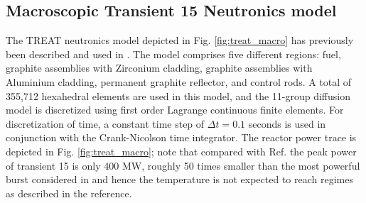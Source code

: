 \documentclass{anstrans}
\begin{document}
\subsection{Macroscopic Transient 15 Neutronics model}\label{sec:macro_model}
The TREAT neutronics model depicted in Fig. \ref{fig:treat_macro} has previously been described and used in \cite{Ortensi2015}.
The model comprises five different regions: fuel, graphite assemblies with Zirconium cladding, graphite assemblies with Aluminium cladding, permanent graphite reflector, and control rods. A total of 355,712 hexahedral elements are used in this model, and the 11-group diffusion model is discretized using first order Lagrange continuous finite elements. For discretization of time, a constant time step of $\Delta t = 0.1$ seconds is used in conjunction with the Crank-Nicolson time integrator. The reactor power trace is depicted in Fig. \ref{fig:treat_macro}; note that compared with Ref. \cite{Mo2015} the peak power of transient 15 is only 400 MW, roughly 50 times smaller than the most powerful burst considered in \cite{Mo2015} and hence the temperature is not expected to reach regimes as described in the reference.
\end{document}
